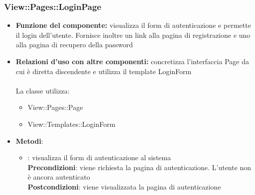 \subsubsection{View::Pages::LoginPage}
\begin{itemize}
\item\textbf{Funzione del componente:} visualizza il form di autenticazione e permette il login dell'utente. Fornisce inoltre un link alla pagina di registrazione e uno alla pagina di recupero della password 
				\item\textbf{Relazioni d'uso con altre componenti:} concretizza l'interfaccia Page da cui è diretta discendente e utilizza il template LoginForm\\ \\
La classe utilizza:
	\begin{itemize}
		\item View::Pages::Page\\
		\item View::Templates::LoginForm\\
	\end{itemize}
\item\textbf{Metodi}:
	\begin{itemize}
		\item{}: visualizza il form di autenticazione al sistema\\
		\textbf{Precondizioni}: viene richiesta la pagina di autenticazione. L'utente non è ancora autenticato\\
		\textbf{Postcondizioni}: viene visualizzata la pagina di autenticazione\\
	\end{itemize}
\end{itemize}

